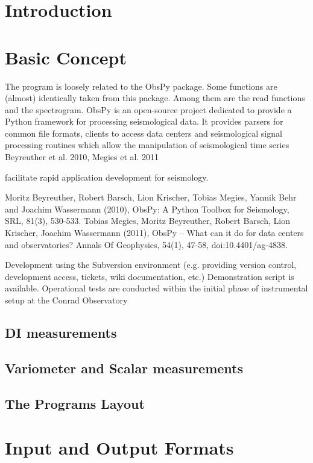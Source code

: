 \section{Introduction}


\section{Basic Concept}

The program is loosely related to the ObsPy package. Some functions are (almost) identically taken from this package. Among them are the read functions and the spectrogram. ObsPy is an open-source project dedicated to provide a Python framework for processing seismological data. It provides parsers for common file formats, clients to access data centers and seismological signal processing routines which allow the manipulation of seismological time series
Beyreuther et al. 2010, Megies et al. 2011

facilitate rapid application development for seismology.

    Moritz Beyreuther, Robert Barsch, Lion Krischer, Tobias Megies, Yannik Behr and Joachim Wassermann (2010), ObsPy: A Python Toolbox for Seismology, SRL, 81(3), 530-533.
    Tobias Megies, Moritz Beyreuther, Robert Barsch, Lion Krischer, Joachim Wassermann (2011), ObsPy – What can it do for data centers and observatories? Annals Of Geophysics, 54(1), 47-58, doi:10.4401/ag-4838.


Development using the Subversion environment (e.g. providing version control, development
access, tickets, wiki documentation, etc.)
Demonstration script is available. Operational tests are conducted within the initial phase of
instrumental setup at the Conrad Observatory

\subsection{DI measurements}

\subsection{Variometer and Scalar measurements}

\subsection{The Programs Layout}


\section{Input and Output Formats}

